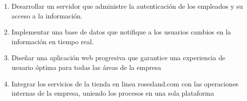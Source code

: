 \begin{enumerate}
\item Desarrollar un servidor que administre la autenticación de los empleados y su acceso a la información.
\item Implementar una base de datos que notifique a los usuarios cambios en la información en tiempo real.
\item Diseñar una aplicación web progresiva que garantice una experiencia de usuario óptima para todas las áreas de la empresa
\item Integrar los servicios de la tienda en linea rosesland.com con las operaciones internas de la empresa, uniendo los procesos en una sola plataforma
\end{enumerate}